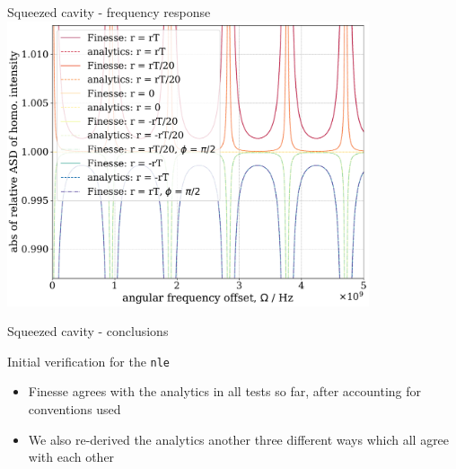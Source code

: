 \documentclass[12pt]{beamer}
\newcommand{\code}[1]{\texttt{#1}}
\begin{document}
\begin{frame}{Squeezed cavity - frequency response}
\centering
\includegraphics[width=0.8\textwidth]{figures/squeezed_cavity_relative_qhd_vs_freq_comparison.pdf}
\end{frame}

\begin{frame}{Squeezed cavity - conclusions}
\begin{block}{Initial verification for the \code{nle}}
\begin{itemize}
\item Finesse agrees with the analytics in all tests so far, after accounting for conventions used
\item We also re-derived the analytics another three different ways which all agree with each other
\end{itemize}
\end{block}
\end{frame}
\end{document}
